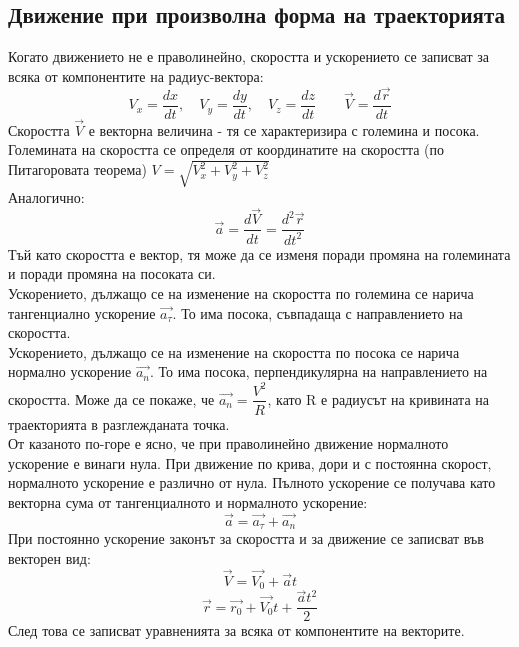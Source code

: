 \documentclass[fleqn, 12pt]{article}
\theoremstyle{definition}
\begin{document}
\subsection{Движение при произволна форма на траекторията}
Когато движението не е праволинейно, скоростта и ускорението се записват за всяка от компонентите на радиус-вектора: 
$$V_x = \dfrac{dx}{dt}, \quad V_y = \dfrac{dy}{dt}, \quad V_z = \dfrac{dz}{dt} \qquad \vec{V} = \dfrac{d\vec{r}}{dt}$$
Скоростта $\vec{V}$ е векторна величина - тя се характеризира с големина и посока. Големината на скоростта се определя от координатите на скоростта (по Питагоровата теорема) $V = \sqrt{V_x^2 + V_y^2 + V_z^2}$ \\
Аналогично: 
$$\vec{a} = \dfrac{d\vec{V}}{dt} = \dfrac{d^2 \vec{r}}{dt^2}$$ 
Тъй като скоростта е вектор, тя може да се изменя поради промяна на големината и поради промяна на посоката си.\\
Ускорението, дължащо се на изменение на скоростта по големина се нарича тангенциално ускорение $\vec{a_\tau}$. То има посока, съвпадаща с направлението на скоростта.\\
Ускорението, дължащо се на изменение на скоростта по посока се нарича нормално ускорение $\vec{a_n}$. То има посока, перпендикулярна на направлението на скоростта. Може да се покаже, че $\vec{a_n} = \dfrac{V^2}{R}$, като R е радиусът на кривината на траекторията в разглежданата точка. \\
От казаното по-горе е ясно, че при праволинейно движение нормалното ускорение е винаги нула. При движение по крива, дори и с постоянна скорост, нормалното ускорение е различно от нула.
Пълното ускорение се получава като векторна сума от тангенциалното и нормалното ускорение:
$$\vec{a} =\vec{a_\tau} + \vec{a_n}$$
При постоянно ускорение законът за скоростта и за движение се записват във векторен вид: 
$$\vec{V} = \vec{V_0} + \vec{a}t$$
$$\vec{r} = \vec{r_0} + \vec{V_0}t + \dfrac{\vec{a}t^2}{2}$$
След това се записват уравненията за всяка от компонентите на векторите.
\end{document}
